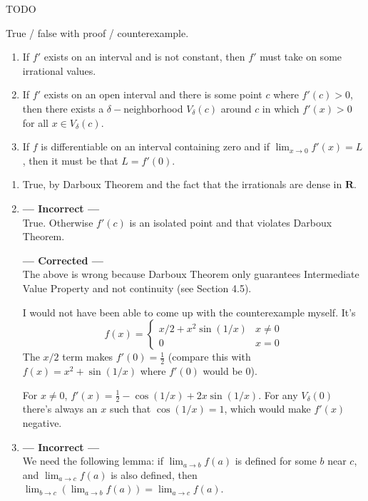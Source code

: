 \documentclass{oxmathproblems}
\begin{document}
\begin{questions}
\miquestion TODO

\miquestion True / false with proof / counterexample.
\begin{enumerate}[label=(\alph*)]
  \item If $f'$ exists on an interval and is not constant, then $f'$ must take on some irrational values.
  \item If $f'$ exists on an open interval and there is some point $c$ where $f'(c) > 0$, then there exists a $\delta-$neighborhood $V_{\delta}(c)$ around $c$ in which
  $f'(x) > 0$ for all $x \in V_{\delta}(c)$.
  \item If $f$ is differentiable on an interval containing zero and if $\lim_{x \to 0}f'(x) = L$, then it must be that $L = f'(0)$.
\end{enumerate}

\begin{solution}
  \begin{enumerate}[label=(\alph*)]
    \item True, by Darboux Theorem and the fact that the irrationals are dense in $\textbf{R}$.
    \item 
    \textbf{--- Incorrect ---}\\
    True. Otherwise $f'(c)$ is an isolated point and that violates Darboux Theorem.

    \textbf{--- Corrected ---} \\
    The above is wrong because Darboux Theorem only guarantees Intermediate Value Property and not continuity (see Section 4.5).

    I would not have been able to come up with the counterexample myself. It's
    \[
      f(x) = 
      \begin{cases}
        x/2 + x^2\sin(1/x) & x \neq 0\\
        0 & x = 0
      \end{cases}
    \]
    The $x/2$ term makes $f'(0) = \frac{1}{2}$ (compare this with $f(x)=x^2+\sin(1/x)$ where $f'(0)$ would be 0).
    
    For $x \neq 0$, $f'(x)=\frac{1}{2} - \cos(1/x) + 2x\sin(1/x)$.
    For any $V_{\delta}(0)$ there's always an $x$ such that $\cos(1/x)=1$, which would make $f'(x)$ negative.
  
    \item 
    \textbf{--- Incorrect ---}\\
    We need the following lemma: if $\lim_{a \to b}f(a)$ is defined for some $b$ near $c$, and $\lim_{a \to c}f(a)$ is also defined,
    then $\lim_{b \to c}(\lim_{a \to b}f(a))=\lim_{a \to c}f(a)$.
  

\end{enumerate}
\end{solution}
\end{questions}
\end{document}
